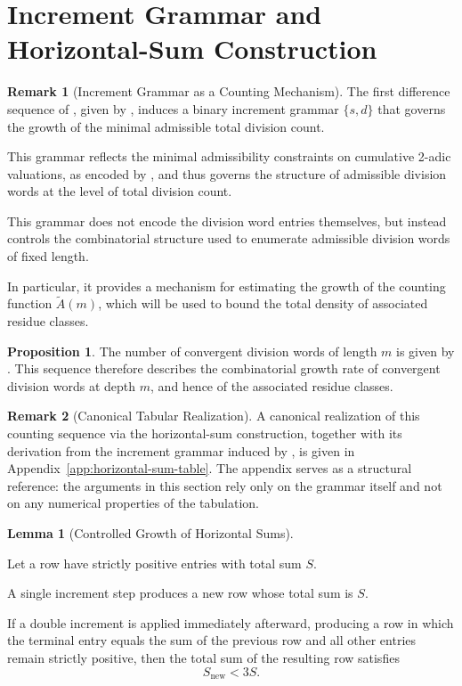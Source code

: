 \documentclass[12pt, oneside]{article}   	%
\numberwithin{equation}{section}          %
\theoremstyle{definition}
\newtheorem{proposition}{Proposition}[section]
\newtheorem{lemma}[theorem]{Lemma}
\newtheorem*{remark}{Remark}
\begin{document}
\newpage
\section{Increment Grammar and Horizontal-Sum Construction}
\label{sec:increment-grammar}

\begin{remark}[Increment Grammar as a Counting Mechanism]
The first difference sequence of , given by ,
induces a binary increment grammar $\{s,d\}$ that governs the growth of the
minimal admissible total division count.

This grammar reflects the minimal admissibility constraints on cumulative
2-adic valuations, as encoded by , and thus governs the
structure of admissible division words at the level of total division count.

This grammar does not encode the division word entries themselves, but instead
controls the combinatorial structure used to enumerate admissible division words
of fixed length.

In particular, it provides a mechanism for estimating the growth of the counting
function $\widetilde A(m)$, which will be used to bound the total density of
associated residue classes.
\end{remark}

\begin{proposition}
The number of convergent division words of length $m$ is given by .
This sequence therefore describes the combinatorial growth rate of convergent
division words at depth $m$, and hence of the associated residue classes.
\end{proposition}

\begin{remark}[Canonical Tabular Realization]
A canonical realization of this counting sequence via the horizontal-sum construction,
together with its derivation from the increment grammar induced by , is given
in Appendix~\ref{app:horizontal-sum-table}. The appendix serves as a structural reference:
the arguments in this section rely only on the grammar itself and not on any numerical
properties of the tabulation.
\end{remark}

\begin{lemma}[Controlled Growth of Horizontal Sums]
\label{lem:controlled-horizontal-growth}

Let a row have strictly positive entries with total sum $S$.

A single increment step produces a new row whose total sum is $S$.

If a double increment is applied immediately afterward, producing a row in which
the terminal entry equals the sum of the previous row and all other entries remain
strictly positive, then the total sum of the resulting row satisfies
\[
S_{\mathrm{new}} < 3S.
\]

\end{lemma}
\end{document}
